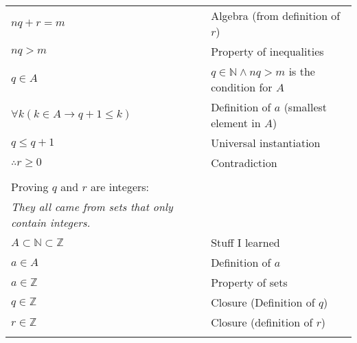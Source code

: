 \begin{tabular}[t]{p{4 in} l}
$nq + r = m $ & Algebra (from definition of $r$) \\
$nq > m$ & Property of inequalities \\
$q \in A$ & $q \in \mathbb{N} \wedge nq > m$ is the condition for $A$ \\
$\forall k (k \in A \rightarrow q + 1 \leq k)$ & Definition of $a$ (smallest element in $A$)\\
$q \leq q + 1$ & Universal instantiation \\
$\therefore r \geq 0$ & Contradiction \\
\\
Proving $q$ and $r$ are integers: \\
\textit{They all came from sets that only contain integers.} \\
$A \subset \mathbb{N} \subset \mathbb{Z}$ & Stuff I learned \\
$a \in A$ & Definition of $a$ \\
$a \in \mathbb{Z}$ & Property of sets \\
$q \in \mathbb{Z}$ & Closure (Definition of $q$) \\
$r \in \mathbb{Z}$ & Closure (definition of $r$) \\
\\

\end{tabular}

